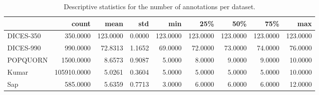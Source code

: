 \begin{table}[ht]
\caption{Descriptive statistics for the number of annotations per dataset.}
\label{tab:num-annot}
\begin{tabular}{lrrrrrrrr}
\toprule
 & count & mean & std & min & 25\% & 50\% & 75\% & max \\
\midrule
DICES-350 & 350.0000 & 123.0000 & 0.0000 & 123.0000 & 123.0000 & 123.0000 & 123.0000 & 123.0000 \\
DICES-990 & 990.0000 & 72.8313 & 1.1652 & 69.0000 & 72.0000 & 73.0000 & 74.0000 & 76.0000 \\
POPQUORN & 1500.0000 & 8.6573 & 0.9087 & 5.0000 & 8.0000 & 9.0000 & 9.0000 & 10.0000 \\
Kumar & 105910.0000 & 5.0261 & 0.3604 & 5.0000 & 5.0000 & 5.0000 & 5.0000 & 10.0000 \\
Sap & 585.0000 & 5.6359 & 0.7713 & 3.0000 & 6.0000 & 6.0000 & 6.0000 & 12.0000 \\
\bottomrule
\end{tabular}
\end{table}
